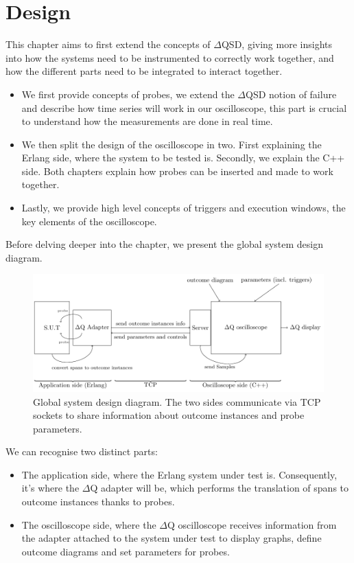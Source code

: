 \chapter{Design}
    This chapter aims to first extend the concepts of $\Delta$QSD, giving more insights into how the systems need to be instrumented to correctly work together, and how the different parts need to be integrated to interact together.
    \begin{itemize}
        \item We first provide concepts of probes, we extend the $\Delta$QSD notion of failure and describe how time series will work in our oscilloscope, this part is crucial to understand how the measurements are done in real time.
        \item We then split the design of the oscilloscope in two. First explaining the Erlang side, where the system to be tested is. Secondly, we explain the C++ side. Both chapters explain how probes can be inserted and made to work together.
        \item Lastly, we provide high level concepts of triggers and execution windows, the key elements of the oscilloscope. 
    \end{itemize}

    Before delving deeper into the chapter, we present the global system design diagram.

    \begin{figure}[H]
        \begin{center}
            \includegraphics[width=\textwidth]{tikz/sut-stub-osc.pdf}
        \end{center}
        \caption{Global system design diagram. The two sides communicate via TCP sockets to share information about outcome instances and probe parameters.}
    \end{figure}

    We can recognise two distinct parts:
    \begin{itemize}
        \item The application side, where the Erlang system under test is. Consequently, it's where the $\Delta$Q adapter will be, which performs the translation of spans to outcome instances thanks to probes.
        \item The oscilloscope side, where the $\Delta$Q oscilloscope receives information from the adapter attached to the system under test to display graphs, define outcome diagrams and set parameters for probes.
    \end{itemize}


